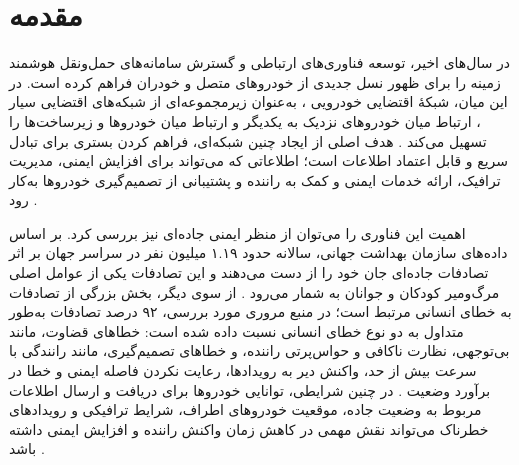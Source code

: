 \documentclass[12pt,a4paper]{article}
\newif\ifpreliminary
\begin{document}
\newpage

\tableofcontents
\newpage

\listoffigures
\newpage

\listoftables
\newpage

\preliminaryfalse

\section{مقدمه}

در سال‌های اخیر، توسعه فناوری‌های ارتباطی و گسترش سامانه‌های حمل‌ونقل هوشمند  زمینه را برای ظهور نسل جدیدی از خودرو‌های متصل و خودران فراهم کرده است. در این میان، شبکهٔ اقتضایی خودرویی ، به‌عنوان زیرمجموعه‌ای از شبکه‌های اقتضایی سیار ، ارتباط میان خودرو‌های نزدیک به یکدیگر و ارتباط میان خودرو‌ها و زیرساخت‌ها را تسهیل می‌کند \cite{hozouriOverviewVANETVehicular2023}. هدف اصلی از ایجاد چنین شبکه‌ای، فراهم کردن بستری برای تبادل سریع و قابل اعتماد اطلاعات است؛ اطلاعاتی که می‌تواند برای افزایش ایمنی، مدیریت ترافیک، ارائه خدمات ایمنی و کمک به راننده و پشتیبانی از تصمیم‌گیری خودرو‌ها به‌کار رود \cite{hozouriOverviewVANETVehicular2023,luConnectedVehiclesSolutions2014}.

اهمیت این فناوری را می‌توان از منظر ایمنی جاده‌ای نیز بررسی کرد. بر اساس داده‌های سازمان بهداشت جهانی، سالانه حدود ۱.۱۹ میلیون نفر در سراسر جهان بر اثر تصادفات جاده‌ای جان خود را از دست می‌دهند و این تصادفات یکی از عوامل اصلی مرگ‌ومیر کودکان و جوانان به شمار می‌رود \cite{farsimadanReviewSecurityChallenges2025,VanetSecurityPrivacy}. از سوی دیگر، بخش بزرگی از تصادفات به خطای انسانی مرتبط است؛ در منبع مروری مورد بررسی، ۹۲ درصد تصادفات به‌طور متداول به دو نوع خطای انسانی نسبت داده شده است: خطا‌های قضاوت، مانند بی‌توجهی، نظارت ناکافی و حواس‌پرتی راننده، و خطا‌های تصمیم‌گیری، مانند رانندگی با سرعت بیش از حد، واکنش دیر به رویدادها، رعایت نکردن فاصله ایمنی و خطا در برآورد وضعیت \cite{hozouriOverviewVANETVehicular2023}. در چنین شرایطی، توانایی خودرو‌ها برای دریافت و ارسال اطلاعات مربوط به وضعیت جاده، موقعیت خودرو‌های اطراف، شرایط ترافیکی و رویداد‌های خطرناک می‌تواند نقش مهمی در کاهش زمان واکنش راننده و افزایش ایمنی داشته باشد \cite{farsimadanReviewSecurityChallenges2025}.
\end{document}
